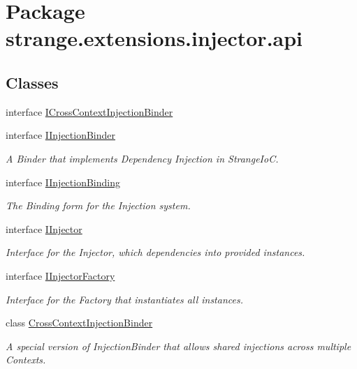 \hypertarget{namespacestrange_1_1extensions_1_1injector_1_1api}{\section{Package strange.\-extensions.\-injector.\-api}
\label{namespacestrange_1_1extensions_1_1injector_1_1api}
}
\subsection*{Classes}
\begin{DoxyCompactItemize}
\item 
interface \hyperlink{interfacestrange_1_1extensions_1_1injector_1_1api_1_1_i_cross_context_injection_binder}{I\-Cross\-Context\-Injection\-Binder}
\item 
interface \hyperlink{interfacestrange_1_1extensions_1_1injector_1_1api_1_1_i_injection_binder}{I\-Injection\-Binder}
\begin{DoxyCompactList}\small\item\em A Binder that implements Dependency Injection in Strange\-Io\-C. \end{DoxyCompactList}\item 
interface \hyperlink{interfacestrange_1_1extensions_1_1injector_1_1api_1_1_i_injection_binding}{I\-Injection\-Binding}
\begin{DoxyCompactList}\small\item\em The Binding form for the Injection system. \end{DoxyCompactList}\item 
interface \hyperlink{interfacestrange_1_1extensions_1_1injector_1_1api_1_1_i_injector}{I\-Injector}
\begin{DoxyCompactList}\small\item\em Interface for the Injector, which dependencies into provided instances. \end{DoxyCompactList}\item 
interface \hyperlink{interfacestrange_1_1extensions_1_1injector_1_1api_1_1_i_injector_factory}{I\-Injector\-Factory}
\begin{DoxyCompactList}\small\item\em Interface for the Factory that instantiates all instances. \end{DoxyCompactList}\item 
class \hyperlink{classstrange_1_1extensions_1_1injector_1_1api_1_1_cross_context_injection_binder}{Cross\-Context\-Injection\-Binder}
\begin{DoxyCompactList}\small\item\em A special version of Injection\-Binder that allows shared injections across multiple Contexts. \end{DoxyCompactList}\end{DoxyCompactItemize}
